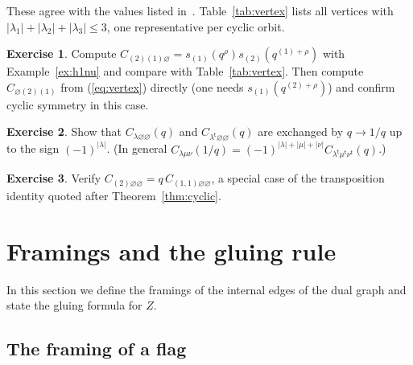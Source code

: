 \documentclass[11pt]{article}
\theoremstyle{plain}
\theoremstyle{definition}
\newtheorem{exercise}{Exercise}[section]
\theoremstyle{remark}
\newcommand{\qrho}{q^{\rho}}
\newcommand{\qlr}[1]{q^{#1+\rho}}
\newcommand{\es}{\varnothing}
\newcommand{\tr}{{\mathsf t}}
\newcommand{\lt}[1]{#1^{\tr}}
\begin{document}
These agree with the values listed in~\cite[p.~6]{Kon}. Table~\ref{tab:vertex} lists all
vertices with $|\lambda_1|+|\lambda_2|+|\lambda_3|\le3$, one representative per cyclic orbit.

\begin{table}[ht]
\centering
\renewcommand{\arraystretch}{1.25}

\caption{(Generated.) The vertex $C_{\lambda_1\lambda_2\lambda_3}(q)$ for
$|\lambda_1|+|\lambda_2|+|\lambda_3|\le 3$, in lowest terms, with the denominator written as a
product of $q$-numbers $[k]=q^{k/2}-q^{-k/2}$. One representative of each cyclic orbit is listed,
and the others follow from Theorem~\ref{thm:cyclic}.}
\label{tab:vertex}
\end{table}

\begin{exercise}\label{ex:vertex1}
Compute $C_{(2)(1)\es}=s_{(1)}(\qrho)s_{(2)}(\qlr{(1)})$ with Example~\ref{ex:h1nu} and compare
with Table~\ref{tab:vertex}. Then compute $C_{\es(2)(1)}$ from (\ref{eq:vertex}) directly (one
needs $s_{(1)}(q^{(2)+\rho})$) and confirm cyclic symmetry in this case.
\end{exercise}

\begin{exercise}\label{ex:vertex2}
Show that $C_{\lambda\es\es}(q)$ and $C_{\lt\lambda\es\es}(q)$ are exchanged by $q\rightarrow1/q$ up to
the sign $(-1)^{|\lambda|}$. (In general $C_{\lambda\mu\nu}(1/q)=(-1)^{|\lambda|+|\mu|+|\nu|}
C_{\lt\lambda\lt\mu\lt\nu}(q)$.)
\end{exercise}

\begin{exercise}\label{ex:vertex3}
Verify $C_{(2)\es\es}=q\,C_{(1,1)\es\es}$, a special case of the transposition identity quoted
after Theorem~\ref{thm:cyclic}.
\end{exercise}

\section{Framings and the gluing rule}\label{sec:gluing}

In this section we define the framings of the internal edges of the dual graph and state the
gluing formula for $Z$.


\subsection{The framing of a flag}\label{ssec:framing}
\end{document}
